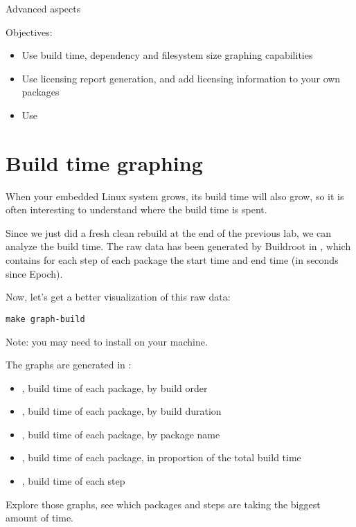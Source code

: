 \subchapter
{Advanced aspects}
{Objectives:
  \begin{itemize}
  \item Use build time, dependency and filesystem size graphing capabilities
  \item Use licensing report generation, and add licensing
    information to your own packages
  \item Use 
  \end{itemize}
}

\section{Build time graphing}

When your embedded Linux system grows, its build time will also grow,
so it is often interesting to understand where the build time is
spent.

Since we just did a fresh clean rebuild at the end of the previous
lab, we can analyze the build time. The raw data has been generated by
Buildroot in , which contains for
each step of each package the start time and end time (in seconds
since Epoch).

Now, let's get a better visualization of this raw data:

\begin{verbatim}
make graph-build
\end{verbatim}

Note: you may need to install  on your machine.

The graphs are generated in :

\begin{itemize}
\item {}, build time of each package, by
  build order
\item {}, build time of each package, by
  build duration
\item {}, build time of each package, by
  package name
\item {}, build time of each package, in
  proportion of the total build time
\item {}, build time of each step
\end{itemize}

Explore those graphs, see which packages and steps are taking the
biggest amount of time.

